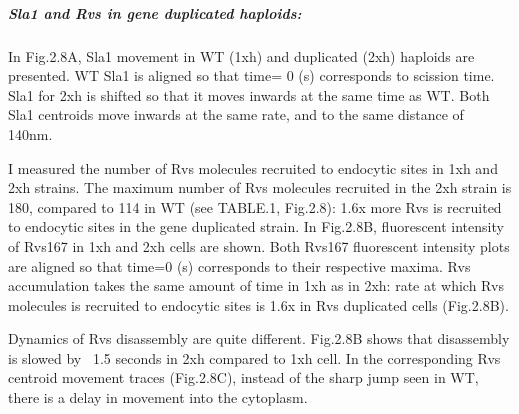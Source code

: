 	

		\subparagraph{Sla1 and Rvs in gene duplicated haploids:}

In Fig.2.8A, Sla1 movement in WT (1xh) and duplicated (2xh) haploids are presented. WT Sla1 is aligned so that time= 0 (s) corresponds to scission time. Sla1 for 2xh is shifted so that it moves inwards at the same time as WT. Both Sla1 centroids move inwards at the same rate, and to the same distance of 140nm. 

I measured the number of Rvs molecules recruited to endocytic sites in 1xh and 2xh strains. The maximum number of Rvs molecules recruited in the 2xh strain is 180, compared to 114 in WT (see TABLE.1, Fig.2.8): 1.6x more Rvs is recruited to endocytic sites in the gene duplicated strain. In Fig.2.8B, fluorescent intensity of Rvs167 in 1xh and 2xh cells are shown. Both Rvs167 fluorescent intensity plots are aligned so that time=0 (s) corresponds to their respective maxima. Rvs accumulation takes the same amount of time in 1xh as in 2xh: rate at which Rvs molecules is recruited to endocytic sites is 1.6x in Rvs duplicated cells (Fig.2.8B). 

Dynamics of Rvs disassembly are quite different. Fig.2.8B shows that disassembly is slowed by ~1.5 seconds in 2xh compared to 1xh cell. In the corresponding Rvs centroid movement traces (Fig.2.8C), instead of the sharp jump seen in WT, there is a delay in movement into the cytoplasm.

